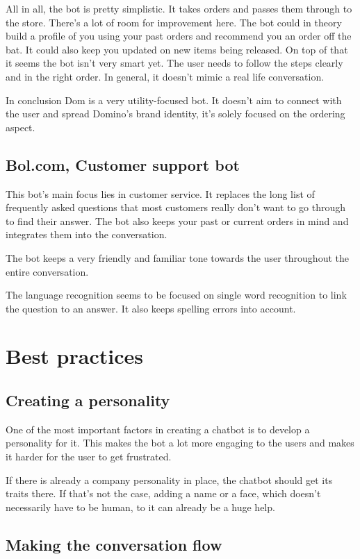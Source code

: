All in all, the bot is pretty simplistic. It takes orders and passes them through to the store. There's a lot of room for improvement here. The bot could in theory build a profile of you using your past orders and recommend you an order off the bat. It could also keep you updated on new items being released. On top of that it seems the bot isn't very smart yet. The user needs to follow the steps clearly and in the right order. In general, it doesn't mimic a real life conversation.

In conclusion Dom is a very utility-focused bot. It doesn't aim to connect with the user and spread Domino's brand identity, it's solely focused on the ordering aspect.

\subsection{Bol.com, Customer support bot}

This bot's main focus lies in customer service. It replaces the long list of frequently asked questions that most customers really don't want to go through to find their answer. The bot also keeps your past or current orders in mind and integrates them into the conversation.

The bot keeps a very friendly and familiar tone towards the user throughout the entire conversation.

The language recognition seems to be focused on single word recognition to link the question to an answer. It also keeps spelling errors into account.

\section{Best practices}

\subsection{Creating a personality}

One of the most important factors in creating a chatbot is to develop a personality for it. This makes the bot a lot more engaging to the users and makes it harder for the user to get frustrated.

If there is already a company personality in place, the chatbot should get its traits there. If that's not the case, adding a name or a face, which doesn't necessarily have to be human, to it can already be a huge help.

\subsection{Making the conversation flow}

